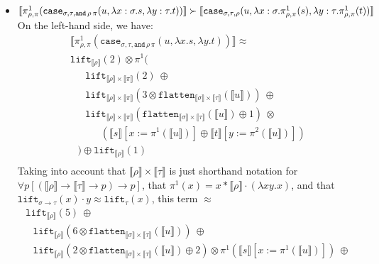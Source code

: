 \documentclass[runningheads,a4paper]{llncs}
\newcommand{\quant}[2]{\forall #1[#2]}
\newcommand{\typeinterpret}[1]{\llbracket #1 \rrbracket}
\newcommand{\interpret}[1]{\llbracket #1 \rrbracket}
\newcommand{\arrtype}{\rightarrow}
\newcommand{\abs}[2]{\lambda #1.#2}
\newcommand{\flatten}{\mathtt{flatten}}
\newcommand{\lift}{\mathtt{lift}}
\begin{document}
\begin{itemize}
\item $\interpret{\pi^1_{\rho,\pi}(\mathtt{case}_{\sigma,\tau,
  \mathtt{and}\,\rho\,\pi}(u,\abs{x:\sigma}{s},\abs{y:\tau}{t}))} \succ \\
  \interpret{\mathtt{case}_{\sigma,\tau,\rho}(u,\abs{x:\sigma}{
  \pi^1_{\rho,\pi}(s)},\abs{y:\tau}{\pi^1_{\rho,\pi}(t)})}$ \\
  On the left-hand side, we have: \\
  \[
  \begin{array}{l}
  \interpret{\pi^1_{\rho,\pi}(\mathtt{case}_{\sigma,\tau,
  \mathtt{and}\,\rho\,\pi}(u,\abs{x}{s},\abs{y}{t}))} \approx \\
  \lift_{\typeinterpret{\rho}}(2) \otimes \pi^1( \\
  \phantom{AB}
    \lift_{\typeinterpret{\rho} \times \typeinterpret{\pi}}(2)\ \oplus \\
  \phantom{AB}
    \lift_{\typeinterpret{\rho} \times \typeinterpret{\pi}}(3 \otimes
    \flatten_{\typeinterpret{\sigma} \times \typeinterpret{\tau}}(
    \interpret{u}))\ \oplus \\
  \phantom{AB}
    \lift_{\typeinterpret{\rho} \times \typeinterpret{\pi}}(
    \flatten_{\typeinterpret{\sigma} \times \typeinterpret{\tau}}(
    \interpret{u}) \oplus 1)\ \otimes \\
  \phantom{ABCD}
    (\interpret{s}[x:=\pi^1(\interpret{u})] \oplus
     \interpret{t}[y:=\pi^2(\interpret{u})]) \\
  \phantom{A}) \oplus \lift_{\typeinterpret{\rho}}(1) \\
  \end{array}
  \]
  Taking into account that $\typeinterpret{\rho} \times
  \typeinterpret{\tau}$ is just shorthand notation for
  $\quant{p}{(\typeinterpret{\rho} \arrtype \typeinterpret{\tau}
  \arrtype p) \arrtype p}$, that $\pi^1(x) = x * \typeinterpret{\rho}
  \cdot (\abs{xy}{x})$, and that $\lift_{\sigma \arrtype \tau}(x)
  \cdot y \approx \lift_\tau(x)$, this term $\approx$
  \[
  \begin{array}{l}
  \lift_{\typeinterpret{\rho}}(5)\ \oplus \\
  \phantom{A}
    \lift_{\typeinterpret{\rho}}(6 \otimes
    \flatten_{\typeinterpret{\sigma} \times \typeinterpret{\tau}}(
    \interpret{u}))\ \oplus \\
  \phantom{A}
    \lift_{\typeinterpret{\rho}}(2 \otimes
    \flatten_{\typeinterpret{\sigma} \times
    \typeinterpret{\tau}}(\interpret{u}) \oplus 2) \otimes
    \pi^1(\interpret{s}[x:=\pi^1(\interpret{u})])\ \oplus \\

\end{array}\]
\end{itemize}
\end{document}
